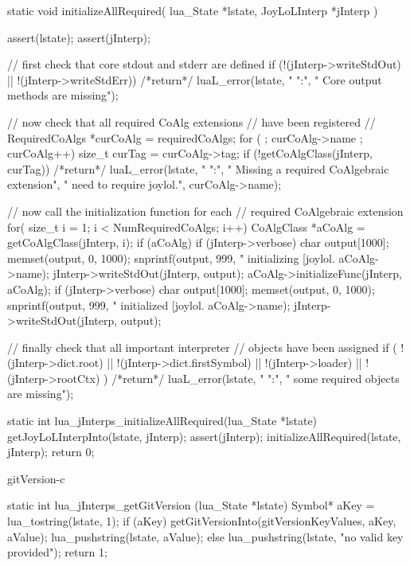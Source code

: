 \startCCode
static void initializeAllRequired(
  lua_State    *lstate,
  JoyLoLInterp *jInterp
) {
  assert(lstate);
  assert(jInterp);
  
  // first check that core stdout and stderr are defined
  if (!(jInterp->writeStdOut) || !(jInterp->writeStdErr)) {
    /*return*/ luaL_error(lstate, "%
      "\nERROR:\n",
      "  Core output methods are missing\n");
  }
  
  // now check that all required CoAlg extensions 
  // have been registered
  //
  RequiredCoAlgs *curCoAlg = requiredCoAlgs;
  for ( ; curCoAlg->name ; curCoAlg++) {
    size_t curTag = curCoAlg->tag;
    if (!getCoAlgClass(jInterp, curTag)) {
      /*return*/ luaL_error(lstate, "%
        "\nERROR:\n",
       "  Missing a required CoAlgebraic extension\n",
       "  need to require joylol.",
       curCoAlg->name);
    }
  }

  // now call the initialization function for each 
  // required CoAlgebraic extension
  for( size_t i = 1; i < NumRequiredCoAlgs; i++) {
    CoAlgClass *aCoAlg = getCoAlgClass(jInterp, i);
    if (aCoAlg) {
      if (jInterp->verbose) {
        char output[1000];
        memset(output, 0, 1000);
        snprintf(output, 999, 
          "    initializing [joylol.%
          aCoAlg->name);
        jInterp->writeStdOut(jInterp, output);
      }
      aCoAlg->initializeFunc(jInterp, aCoAlg);
      if (jInterp->verbose) {
        char output[1000];
        memset(output, 0, 1000);
        snprintf(output, 999, 
          "    initialized [joylol.%
          aCoAlg->name);
        jInterp->writeStdOut(jInterp, output);
      }
    }
  }
  
  // finally check that all important interpreter 
  // objects have been assigned
  if (
    !(jInterp->dict.root) || 
    !(jInterp->dict.firstSymbol) ||
    !(jInterp->loader) ||
    !(jInterp->rootCtx)
    ) {
      /*return*/ luaL_error(lstate, "%
        "\nERROR:\n",
        "  some required objects are missing\n\n");
    }
}

static int lua_jInterps_initializeAllRequired(lua_State *lstate) {
  getJoyLoLInterpInto(lstate, jInterp);
  assert(jInterp);
  initializeAllRequired(lstate, jInterp);
  return 0;
}
\stopCCode

\component gitVersion-c

\startCCode
static int lua_jInterps_getGitVersion (lua_State *lstate) {
  Symbol* aKey   = lua_tostring(lstate, 1);
  if (aKey) {
    getGitVersionInto(gitVersionKeyValues, aKey, aValue);
    lua_pushstring(lstate, aValue);
  } else {
    lua_pushstring(lstate, "no valid key provided");
  }
  return 1;
}
\stopCCode


